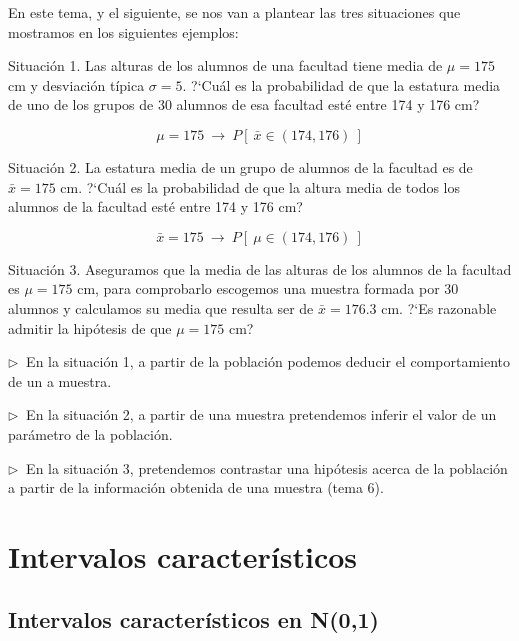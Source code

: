 \begin{destacado}
En este tema, y el siguiente, se nos van a plantear las tres situaciones que mostramos en los siguientes ejemplos:

\vspace{2mm} Situación 1.	Las alturas de los alumnos de una facultad tiene media de $\mu=175$ cm y desviación típica $\sigma=5$. ?`Cuál es la probabilidad de que la estatura media de uno de los grupos de 30 alumnos de esa facultad esté entre 174 y 176 cm?

$$ \mu = 175 \ \longrightarrow \ P[ \ \bar x \in (174,176) \ ]$$

\vspace{2mm} Situación 2. La estatura media de un grupo de alumnos de la facultad es de $\bar x=175$ cm. ?`Cuál es la probabilidad de que la altura media de todos los alumnos de la facultad esté entre 174 y 176 cm?

$$ \bar x = 175 \ \longrightarrow \ P[ \ \mu \in (174,176) \ ]$$

\vspace{2mm} Situación 3. Aseguramos que la media de las alturas de los alumnos de la facultad es $\mu=175$ cm, para comprobarlo escogemos una muestra formada por 30 alumnos y calculamos su media que resulta ser de $\bar x=176.3$ cm. ?`Es razonable admitir la hipótesis de que $\mu=175$ cm?



\vspace{5mm} $\triangleright \ $ En la situación 1, a partir de la población podemos deducir el comportamiento de un a muestra.

\vspace{2mm} $\triangleright \ $ En la situación 2, a partir de una muestra pretendemos inferir el valor de un parámetro de la población.

\vspace{2mm} $\triangleright \ $ En la situación 3, pretendemos contrastar una hipótesis acerca de la población a partir de la información obtenida de una muestra (tema 6).



	
\end{destacado}



\section{Intervalos característicos}

\subsection{Intervalos característicos en N(0,1)}

